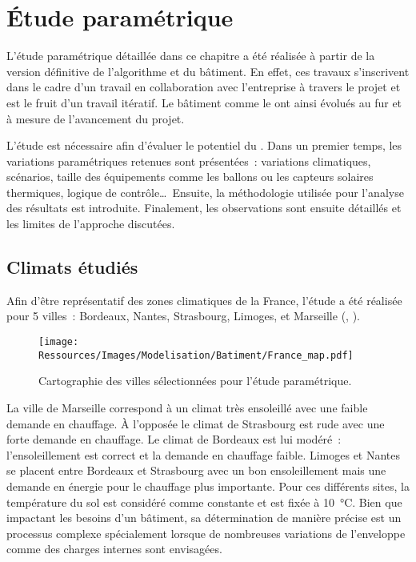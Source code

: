 \section{Étude paramétrique} %
\label{sec:etude_parametrique}
L’étude paramétrique détaillée dans ce chapitre a été réalisée à partir de la
version définitive de l’algorithme et du bâtiment. En effet, ces travaux s’inscrivent
dans le cadre d’un travail en collaboration avec l’entreprise  à travers le projet
 et est le fruit d’un travail itératif. Le bâtiment comme le  ont
ainsi évolués au fur et à mesure de l’avancement du projet.

L’étude est nécessaire afin d’évaluer le potentiel du . Dans un premier temps,
les variations paramétriques retenues sont présentées~: variations climatiques, scénarios,
taille des équipements comme les ballons ou les capteurs solaires thermiques, logique de
contrôle\dots\ Ensuite, la méthodologie utilisée pour l’analyse des résultats est
introduite. Finalement, les observations sont ensuite détaillés et les limites de
l’approche discutées.


\subsection{Climats étudiés} %
\label{sub:climats_etudies}
Afin d’être représentatif des zones climatiques de la France, l’étude a été réalisée
pour 5 villes~: Bordeaux, Nantes, Strasbourg, Limoges, et Marseille (,
).

\begin{figure}
    \centering
    \texttt{[image: Ressources/Images/Modelisation/Batiment/France\_map.pdf]}
    \caption[Cartographie des villes sélectionnées pour l’étude paramétrique]
            {Cartographie des villes sélectionnées pour l’étude paramétrique.}
    \label{fig:carte_france}
\end{figure}

La ville de Marseille correspond à un climat très ensoleillé avec une faible demande en
chauffage. À l’opposée le climat de Strasbourg est rude avec
une forte demande en chauffage. Le climat de Bordeaux est lui modéré~: l’ensoleillement est correct
et la demande en chauffage faible. Limoges et Nantes se placent entre Bordeaux et
Strasbourg avec un bon ensoleillement mais une demande en énergie pour le chauffage plus
importante. Pour ces différents sites, la température du sol est
considéré comme constante et est fixée à \SI{10}{\celsius}. Bien que impactant les besoins
d’un bâtiment, sa détermination de manière précise est un processus complexe spécialement
lorsque de nombreuses variations de l’enveloppe comme des charges internes sont envisagées.

